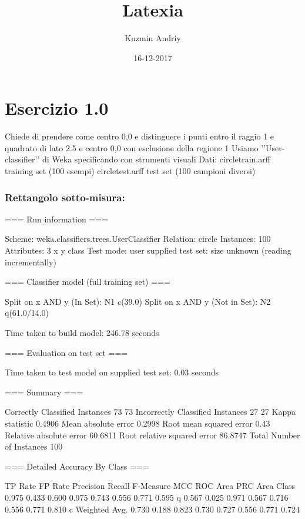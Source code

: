 \documentclass{report}
\title{Latexia}
\date{16-12-2017}
\author{Kuzmin Andriy}
\begin{document}
	\maketitle
	\newpage
	
	\part{Esercizio 1.0 }
	Chiede di prendere come centro 0,0 e distinguere i punti entro il raggio 1 e quadrato di lato 2.5 e centro 0,0 con esclusione della regione 1
	Usiamo ’’User-classifier’’ di Weka specificando con strumenti visuali
	Dati:
	circletrain.arff training set (100 esempi)
	circletest.arff test set (100 campioni diversi)
	
	\section{Rettangolo sotto-misura:}
	=== Run information ===
	
	Scheme:       weka.classifiers.trees.UserClassifier 
	Relation:     circle
	Instances:    100
	Attributes:   3
	x
	y
	class
	Test mode:    user supplied test set:  size unknown (reading incrementally)
	
	=== Classifier model (full training set) ===
	
	
	Split on x AND y (In Set): N1 c(39.0)
	Split on x AND y (Not in Set): N2 q(61.0/14.0)
	
	Time taken to build model: 246.78 seconds
	
	=== Evaluation on test set ===
	
	Time taken to test model on supplied test set: 0.03 seconds
	
	=== Summary ===
	
	Correctly Classified Instances          73               73      %
	Incorrectly Classified Instances        27               27      %
	Kappa statistic                          0.4906
	Mean absolute error                      0.2998
	Root mean squared error                  0.43  
	Relative absolute error                 60.6811 %
	Root relative squared error             86.8747 %
	Total Number of Instances              100     
	
	=== Detailed Accuracy By Class ===
	
	TP Rate  FP Rate  Precision  Recall   F-Measure  MCC      ROC Area  PRC Area  Class
	0.975    0.433    0.600      0.975    0.743      0.556    0.771     0.595     q
	0.567    0.025    0.971      0.567    0.716      0.556    0.771     0.810     c
	Weighted Avg.    0.730    0.188    0.823      0.730    0.727      0.556    0.771     0.724     
	
\end{document}
